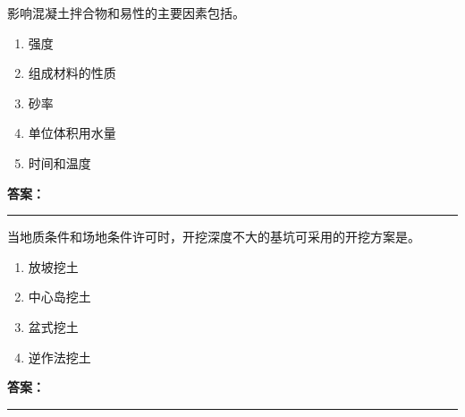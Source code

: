 \documentclass[UTF8,fontset=fandol,11pt]{ctexart}
\newcommand{\answerline}{\textcolor{answerred}{\rule{2.4cm}{0.7pt}}}
\begin{document}
\begin{quizbox}[title={乱序第 5 题｜第四章混凝土结构工程}]

影响混凝土拌合物和易性的主要因素包括。\\

\begin{enumerate}[label=\Alph*.]

\item 强度

\item 组成材料的性质

\item 砂率

\item 单位体积用水量

\item 时间和温度

\end{enumerate}

\textbf{\textcolor{answerred}{答案：}} \answerline

\end{quizbox}

\vspace{0.2em}

\begin{quizbox}[title={乱序第 6 题｜第一章土方工程}]

当地质条件和场地条件许可时，开挖深度不大的基坑可采用的开挖方案是。\\

\begin{enumerate}[label=\Alph*.]

\item 放坡挖土

\item 中心岛挖土

\item 盆式挖土

\item 逆作法挖土

\end{enumerate}

\textbf{\textcolor{answerred}{答案：}} \answerline

\end{quizbox}

\vspace{0.2em}
\end{document}
